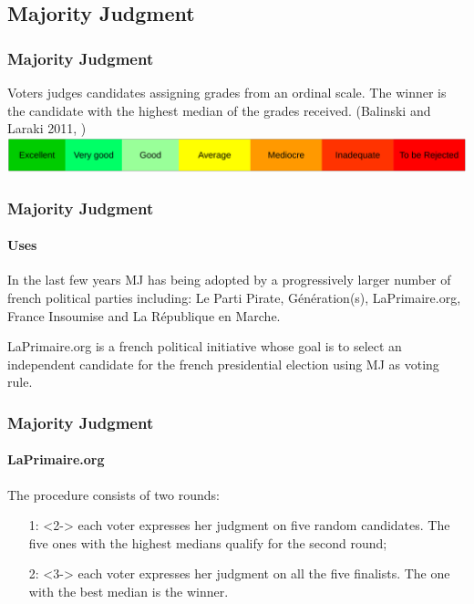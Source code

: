 \documentclass{beamer}
\begin{document}
\subsection{Majority Judgment}
\begin{frame}
	\frametitle{Majority Judgment}
		Voters judges candidates assigning grades from an ordinal scale. The winner is the candidate with the highest median of the grades received. (Balinski and Laraki 2011, \cite{Balinski2011}) \vspace{1cm} \\
	\includegraphics[width=\textwidth]{vector}
\end{frame}

\begin{frame}
	\frametitle{Majority Judgment}
	\framesubtitle{Uses}
	 In the last few years MJ has being adopted by a progressively larger number of french political parties including: Le Parti Pirate, Génération(s), LaPrimaire.org, France Insoumise and La République en Marche. \cite{MV} \vspace{1cm}
	
	 LaPrimaire.org is a french political initiative whose goal is to select an independent candidate for the french presidential election using MJ as voting rule.
\end{frame}

\begin{frame}
	\frametitle{Majority Judgment}
	\framesubtitle{LaPrimaire.org}
	The procedure consists of two rounds:
	\begin{itemize}
		\item[1:]<2-> each voter expresses her judgment on five random candidates. The five ones with the highest medians qualify for the second round; 
		\item[2:]<3-> each voter expresses her judgment on all the five finalists. The one with the best median is the winner.
	\end{itemize}
\end{frame}
\end{document}
